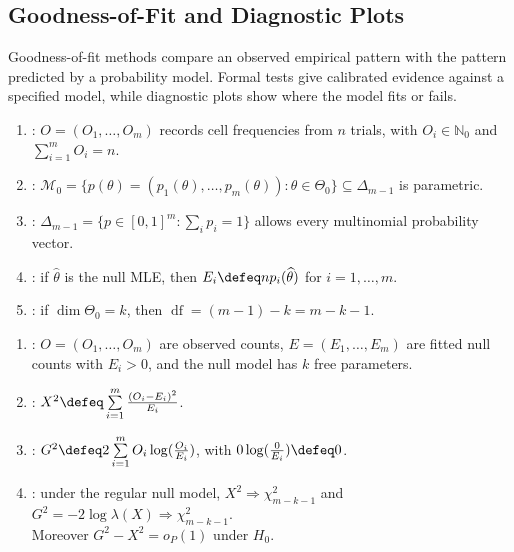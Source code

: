 \subsection{Goodness-of-Fit and Diagnostic Plots}

Goodness-of-fit methods compare an observed empirical pattern with the pattern predicted by a probability model.  Formal tests give calibrated evidence against a specified model, while diagnostic plots show where the model fits or fails.

\begin{definition} \label{def:multinomial-goodness-of-fit-model} 
\begin{enumerate}[label=(\roman*)]
\setlength{\itemsep}{0pt}
\item {}: $O=(O_1,\ldots,O_m)$ records cell frequencies from $n$ trials, with $O_i\in\mathbb{N}_0$ and $\sum\limits_{i=1}^mO_i=n$.
\item {}: $\mathcal{M}_0=\{p(\theta)=(p_1(\theta),\ldots,p_m(\theta)):\theta\in\Theta_0\}\subseteq\Delta_{m-1}$ is parametric.
\item {}: $\Delta_{m-1}=\{p\in[0,1]^m:\sum\limits_i p_i=1\}$ allows every multinomial probability vector.
\item {}: if $\widehat{\theta}$ is the null MLE, then $E_i\defeq np_i(\widehat{\theta})$ for $i=1,\ldots,m$.
\item {}: if $\dim\Theta_0=k$, then $\operatorname{df}=(m-1)-k=m-k-1$.
\end{enumerate}
\end{definition}

\begin{definition} \label{def:pearson-and-likelihood-ratio-gof-statistics} 
\begin{enumerate}[label=(\roman*)]
\setlength{\itemsep}{0pt}
\item {}: $O=(O_1,\ldots,O_m)$ are observed counts, $E=(E_1,\ldots,E_m)$ are fitted null counts with $E_i>0$, and the null model has $k$ free parameters.
\item {}: $X^2\defeq\sum\limits_{i=1}^m\frac{(O_i-E_i)^2}{E_i}$.
\item {}: $G^2\defeq2\sum\limits_{i=1}^mO_i\log(\frac{O_i}{E_i})$, with $0\log(\frac{0}{E_i})\defeq0$.
\item {}: under the regular null model, $X^2\Rightarrow\chi^2_{m-k-1}$ and $G^2=-2\log\lambda(X)\Rightarrow\chi^2_{m-k-1}$.\\
Moreover $G^2-X^2=o_{P}(1)$ under $H_0$.
\end{enumerate}
\end{definition}

